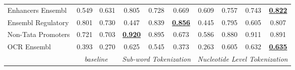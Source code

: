 \begin{table*}[h!]
\begin{center}
\begin{tabular}{l|cc|ccc|cccc}
Enhancers Ensembl & 0.549 & 0.631 & 0.805 & 0.728 & 0.669 & 0.609 & 0.757 & 0.743 & {\ul \textbf{0.822}} \\
Ensembl Regulatory & 0.801 & 0.730 & 0.447 & 0.839 & {\ul \textbf{0.856}} & 0.445 & 0.795 & 0.605 & 0.807 \\
Non-Tata Promoters & 0.721 & 0.703 & {\ul \textbf{0.920}} & 0.895 & 0.673 & 0.586 & 0.880 & 0.911 & 0.891 \\
OCR Ensembl & 0.393 & 0.270 & 0.625 & 0.545 & 0.373 & 0.263 & 0.605 & 0.632 & {\ul \textbf{0.635}} \\
\hline
\multicolumn{1}{l|}{} & \multicolumn{2}{c|}{\textit{baseline}} & \multicolumn{3}{c|}{\textit{Sub-word Tokenization}} & \multicolumn{4}{c}{\textit{Nucleotide Level Tokenization}} \\ \hline
\end{tabular}
\end{center}
\end{table*}